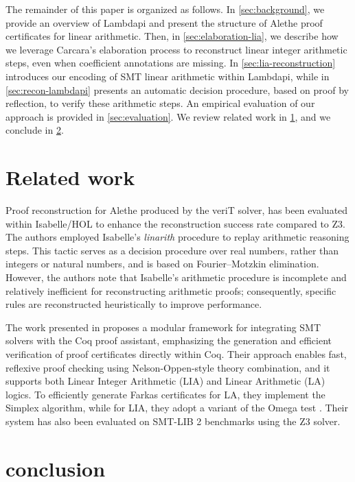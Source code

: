\documentclass[runningheads]{llncs}
\begin{document}
The remainder of this paper is organized as follows.
In \cref{sec:background}, we provide an overview of Lambdapi and present the structure of Alethe proof certificates for linear arithmetic.
Then, in \cref{sec:elaboration-lia}, we describe how we leverage Carcara's elaboration process to reconstruct linear integer arithmetic steps, even when coefficient annotations are missing.
In \cref{sec:lia-reconstruction} introduces our encoding of SMT linear arithmetic within Lambdapi, while in \cref{sec:recon-lambdapi} presents an automatic decision procedure, based on proof by reflection, to verify these arithmetic steps.
An empirical evaluation of our approach is provided in \cref{sec:evaluation}. We review related work in \cref{sec:related}, and we conclude in \cref{sec:conclusion}.











\section{Related work}
\label{sec:related}

Proof reconstruction for Alethe produced by the veriT solver, has been evaluated within Isabelle/HOL to enhance the reconstruction success rate compared to Z3.
The authors employed Isabelle’s \emph{linarith} procedure to replay arithmetic reasoning steps. This tactic serves as a decision procedure over real numbers, rather than integers or natural numbers, and is based on Fourier–Motzkin elimination.
However, the authors note that Isabelle’s arithmetic procedure is incomplete and relatively inefficient for reconstructing arithmetic proofs; consequently, specific rules are reconstructed heuristically to improve performance.

The work presented in \cite{micromega} proposes a modular framework for integrating SMT solvers with the Coq proof assistant, emphasizing the generation and efficient verification of proof certificates directly within Coq.
Their approach enables fast, reflexive proof checking using Nelson-Oppen-style theory combination, and it supports both Linear Integer Arithmetic (LIA) and Linear Arithmetic (LA) logics.
To efficiently generate Farkas certificates for LA, they implement the Simplex algorithm, while for LIA, they adopt a variant of the Omega test \cite{omegatest}.
Their system has also been evaluated on SMT-LIB 2 benchmarks using the Z3 solver.



\section{conclusion}
\label{sec:conclusion}





\end{document}
